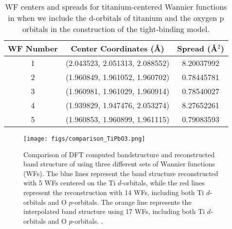 \documentclass[%
 reprint,
 amsmath,amssymb,
 aps,
]{revtex4-2}
\begin{document}
\begin{table}[H]
\centering
\begin{tabular}{|c|c|c|}
\hline
\textbf{WF Number} & \textbf{Center Coordinates (Å)} & \textbf{Spread (Å\(^2\))} \\ \hline
1 & (2.043523, 2.051313, 2.088552) & 8.20037992 \\ \hline
2 & (1.960849, 1.961052, 1.960702) & 0.78445781 \\ \hline
3 & (1.960981, 1.961029, 1.960914) & 0.78540027 \\ \hline
4 & (1.939829, 1.947476, 2.053274) & 8.27652261 \\ \hline
5 & (1.960853, 1.960899, 1.961115) & 0.79083593 \\ \hline
\end{tabular}
\label{table:wannier-centers-TiPbO3-1}
\caption{WF centers and spreads for titanium-centered Wannier functions in  when we include the d-orbitals of titanium and the oxygen p orbitals in the construction of the tight-binding model.}
\end{table}

\begin{figure}[H]
    \centering
    \texttt{[image: figs/comparison\_TiPbO3.png]}
   \caption{
Comparison of DFT computed bandstructure and reconstructed band structure of  using three different sets of Wannier functions (WFs). The blue lines represent the band structure reconstructed with 5 WFs centered on the Ti \(d\)-orbitals, while the red lines represent the reconstruction with 14 WFs, including both Ti \(d\)-orbitals and O \(p\)-orbitals. The orange line represents the interpolated band structure using 17 WFs, including both Ti \(d\)-orbitals and O \(p\)-orbitals. . 
}
\label{fig:TiPbO3-reconstructed-bandstructure}
\end{figure}
\nocite{*}

\end{document}
